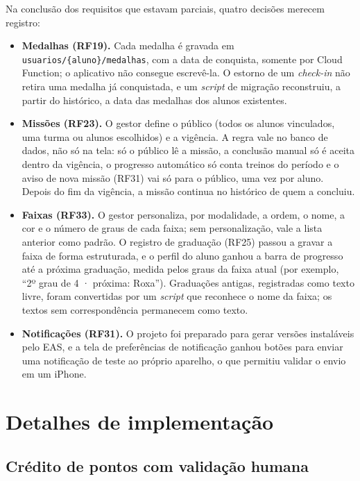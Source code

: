 Na conclusão dos requisitos que estavam parciais, quatro decisões
merecem registro:

\begin{itemize}
  \item \textbf{Medalhas (RF19).} Cada medalha é gravada em
        \texttt{usuarios/\{aluno\}/medalhas}, com a data de conquista,
        somente por Cloud Function; o aplicativo não consegue escrevê-la.
        O estorno de um \textit{check-in} não retira uma medalha já
        conquistada, e um \textit{script} de migração reconstruiu, a partir
        do histórico, a data das medalhas dos alunos existentes.
  \item \textbf{Missões (RF23).} O gestor define o público (todos os alunos
        vinculados, uma turma ou alunos escolhidos) e a vigência. A regra
        vale no banco de dados, não só na tela: só o público lê a missão,
        a conclusão manual só é aceita dentro da vigência, o progresso
        automático só conta treinos do período e o aviso de nova missão
        (RF31) vai só para o público, uma vez por aluno. Depois do fim da
        vigência, a missão continua no histórico de quem a concluiu.
  \item \textbf{Faixas (RF33).} O gestor personaliza, por modalidade, a
        ordem, o nome, a cor e o número de graus de cada faixa; sem
        personalização, vale a lista anterior como padrão. O registro de
        graduação (RF25) passou a gravar a faixa de forma estruturada, e o
        perfil do aluno ganhou a barra de progresso até a próxima
        graduação, medida pelos graus da faixa atual (por exemplo, ``2º
        grau de 4 · próxima: Roxa''). Graduações antigas, registradas como
        texto livre, foram convertidas por um \textit{script} que reconhece
        o nome da faixa; os textos sem correspondência permanecem como
        texto.
  \item \textbf{Notificações (RF31).} O projeto foi preparado para gerar
        versões instaláveis pelo EAS, e a tela de preferências de
        notificação ganhou botões para enviar uma notificação de teste ao
        próprio aparelho, o que permitiu validar o envio em um iPhone.
\end{itemize}

\section{Detalhes de implementação}

\subsection{Crédito de pontos com validação humana}

